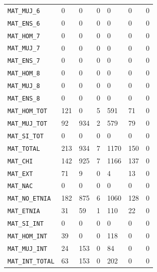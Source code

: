 \documentclass[10pt]{article}
\begin{document}
\begin{xltabular}{\linewidth}{@{}p{4.3cm} Y Y Y Y Y Y @{}}
\texttt{MAT\_\allowbreak{}MUJ\_\allowbreak{}6} & 0 & 0 & 0 & 0 & 0 & 0 \\
\texttt{MAT\_\allowbreak{}ENS\_\allowbreak{}6} & 0 & 0 & 0 & 0 & 0 & 0 \\
\texttt{MAT\_\allowbreak{}HOM\_\allowbreak{}7} & 0 & 0 & 0 & 0 & 0 & 0 \\
\texttt{MAT\_\allowbreak{}MUJ\_\allowbreak{}7} & 0 & 0 & 0 & 0 & 0 & 0 \\
\texttt{MAT\_\allowbreak{}ENS\_\allowbreak{}7} & 0 & 0 & 0 & 0 & 0 & 0 \\
\texttt{MAT\_\allowbreak{}HOM\_\allowbreak{}8} & 0 & 0 & 0 & 0 & 0 & 0 \\
\texttt{MAT\_\allowbreak{}MUJ\_\allowbreak{}8} & 0 & 0 & 0 & 0 & 0 & 0 \\
\texttt{MAT\_\allowbreak{}ENS\_\allowbreak{}8} & 0 & 0 & 0 & 0 & 0 & 0 \\
\texttt{MAT\_\allowbreak{}HOM\_\allowbreak{}TOT} & 121 & 0 & 5 & 591 & 71 & 0 \\
\texttt{MAT\_\allowbreak{}MUJ\_\allowbreak{}TOT} & 92 & 934 & 2 & 579 & 79 & 0 \\
\texttt{MAT\_\allowbreak{}SI\_\allowbreak{}TOT} & 0 & 0 & 0 & 0 & 0 & 0 \\
\texttt{MAT\_\allowbreak{}TOTAL} & 213 & 934 & 7 & 1170 & 150 & 0 \\
\texttt{MAT\_\allowbreak{}CHI} & 142 & 925 & 7 & 1166 & 137 & 0 \\
\texttt{MAT\_\allowbreak{}EXT} & 71 & 9 & 0 & 4 & 13 & 0 \\
\texttt{MAT\_\allowbreak{}NAC} & 0 & 0 & 0 & 0 & 0 & 0 \\
\texttt{MAT\_\allowbreak{}NO\_\allowbreak{}ETNIA} & 182 & 875 & 6 & 1060 & 128 & 0 \\
\texttt{MAT\_\allowbreak{}ETNIA} & 31 & 59 & 1 & 110 & 22 & 0 \\
\texttt{MAT\_\allowbreak{}SI\_\allowbreak{}INT} & 0 & 0 & 0 & 0 & 0 & 0 \\
\texttt{MAT\_\allowbreak{}HOM\_\allowbreak{}INT} & 39 & 0 & 0 & 118 & 0 & 0 \\
\texttt{MAT\_\allowbreak{}MUJ\_\allowbreak{}INT} & 24 & 153 & 0 & 84 & 0 & 0 \\
\texttt{MAT\_\allowbreak{}INT\_\allowbreak{}TOTAL} & 63 & 153 & 0 & 202 & 0 & 0 \\

\end{xltabular}
\end{document}
